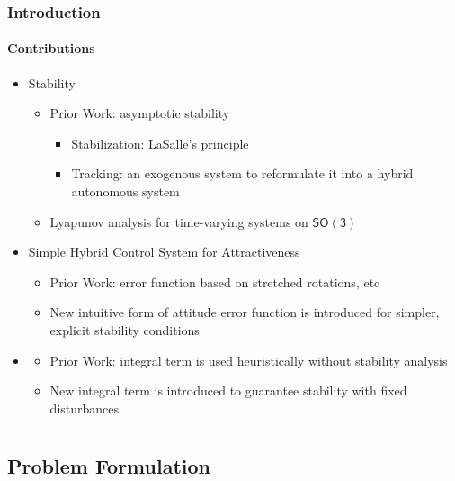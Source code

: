 \documentclass[11pt,professionalfonts,hyperref={pdftex,pdfpagemode=none,pdfstartview=FitH}]{beamer}
\newcommand{\SO}{\ensuremath{\mathsf{SO(3)}}}
\renewcommand{\emph}[1]{\textit{\textbf{\color{blue}{#1}}}}
\begin{document}
\begin{frame}
\frametitle{Introduction}
\framesubtitle{Contributions}

\begin{itemize}
\item \emph{Exponential} Stability
	\begin{itemize}
	\item Prior Work: asymptotic stability
		\begin{itemize}
		\item Stabilization: LaSalle's principle
		\item Tracking: an exogenous system to reformulate it into a hybrid autonomous system
		\end{itemize} 
	\item Lyapunov analysis for time-varying systems on $\SO$
	\end{itemize}
\vspace*{0.3cm}\pause
\item Simple Hybrid Control System for \emph{Global} Attractiveness
	\begin{itemize}
	\item Prior Work: error function based on stretched rotations, etc
	\item New intuitive form of attitude error function is introduced for simpler, explicit stability conditions
	\end{itemize}
\vspace*{0.3cm}\pause
\item \emph{Robustness}
	\begin{itemize}
	\item Prior Work: integral term is used heuristically without stability analysis
	\item New integral term is introduced to guarantee stability with fixed disturbances
	\end{itemize}
\end{itemize}
\end{frame}


\section*{}
\subsection*{Problem Formulation}
\end{document}
